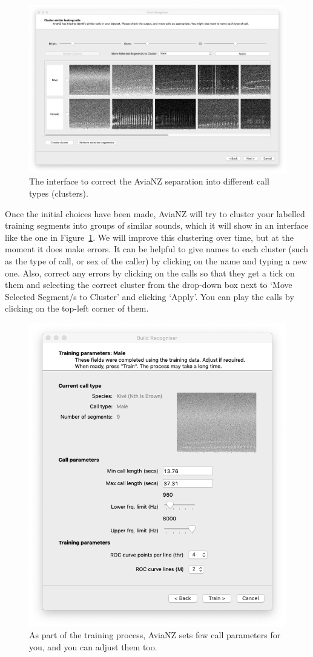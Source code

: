 \documentclass{article}
\begin{document}
    \begin{figure}[h]
    \centering
    \includegraphics[width=.6\textwidth]{Figs/Wizard_cluster}
    \caption{The interface to correct the AviaNZ separation into different call types (clusters).}
    \label{fig:clusters}
    \end{figure}
    
Once the initial choices have been made, AviaNZ will try to cluster your labelled training segments into groups of similar sounds, which it will show in an interface like the one in Figure~\ref{fig:clusters}. We will improve this clustering over time, but at the moment it does make errors. It can be helpful to give names to each cluster (such as the type of call, or sex of the caller) by clicking on the name and typing a new one. Also, correct any errors by clicking on the calls so that they get a tick on them and selecting the correct cluster from the drop-down box next to `Move Selected Segment/s to Cluster' and clicking `Apply'. You can play the calls by clicking on the top-left corner of them.

       \begin{figure}[h]
    \centering
    \includegraphics[width=.4\textwidth]{Figs/Wizard_params}
    \caption{As part of the training process, AviaNZ sets few call parameters for you, and you can adjust them too.}
    \label{fig:filterparams}
    \end{figure}
\end{document}
